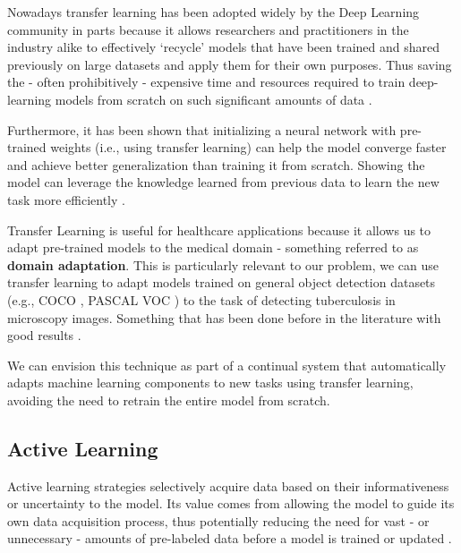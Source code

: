 \documentclass[../main.tex]{subfiles}
\begin{document}
     Nowadays transfer learning has been adopted widely by the Deep Learning community in parts because it allows researchers and practitioners in the industry alike to effectively `recycle' models that have been trained and shared previously on large datasets and apply them for their own purposes. Thus saving the - often prohibitively - expensive time and resources required to train deep-learning models from scratch on such significant amounts of data  \cite{yosinskiHowTransferableAre2014}.

     Furthermore, it has been shown that initializing a neural network with pre-trained weights (i.e., using transfer learning) can help the model converge faster and achieve better generalization than training it from scratch. Showing the model can leverage the knowledge learned from previous data to learn the new task more efficiently \cite{yosinskiHowTransferableAre2014}.

     Transfer Learning is useful for healthcare applications because it allows us to adapt pre-trained models to the medical domain - something referred to as \textbf{domain adaptation}. This is particularly relevant to our problem, we can use transfer learning to adapt models trained on general object detection datasets (e.g., COCO \cite{linMicrosoftCOCOCommon2015}, PASCAL VOC \cite{everinghamPascalVisualObject2010}) to the task of detecting tuberculosis in microscopy images. Something that has been done before in the literature with good results \cite{visuna_novel_2023}.

     \clearpage

     We can envision this technique as part of a continual system that automatically adapts machine learning components to new tasks using transfer learning, avoiding the need to retrain the entire model from scratch.

	
    \subsection{Active Learning} \label{sec:active_learning} 
 
     Active learning strategies selectively acquire data based on their informativeness or uncertainty to the model. Its value comes from allowing the model to guide its own data acquisition process, thus potentially reducing the need for vast - or unnecessary - amounts of pre-labeled data before a model is trained or updated \cite{huyen_designing_2022, chen_study_2015, figueroa_predicting_2012}. 
     
\end{document}
